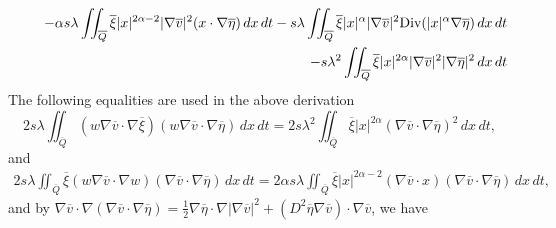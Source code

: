 \documentclass[11pt]{article}
\numberwithin{equation}{section}
\begin{document}
\begin{eqnarray*}
	&&\hspace{4.5mm} - \alpha s\lambda \iint_{\overline{Q}} \overline{\xi} |x|^{2\alpha-2} |\nabla \overline{v}|^2 (x \cdot \nabla \overline{\eta}) \, dx \, dt - s\lambda \iint_{\overline{Q}} \overline{\xi} |x|^\alpha |\nabla \overline{v}|^2 \text{Div}(|x|^\alpha \nabla \overline{\eta}) \, dx \, dt\\
	&&\hspace{4.5mm} - s\lambda^2 \iint_{\overline{Q}} \overline{\xi} |x|^{2\alpha} |\nabla \overline{v}|^2 |\nabla \overline{\eta}|^2 \, dx \, dt
\end{eqnarray*}
The following equalities are used in the above derivation
\begin{equation*}
	2s\lambda \iint_{\overline{Q}} (w \nabla \overline{v} \cdot \nabla \overline{\xi}) (w \nabla \overline{v} \cdot \nabla \overline{\eta}) \, dx \, dt = 2s\lambda^2 \iint_{\overline{Q}} \overline{\xi} |x|^{2\alpha} (\nabla \overline{v} \cdot \nabla \overline{\eta})^2 \, dx \, dt,
\end{equation*}
and
\begin{equation*}
	\begin{split}
		2s\lambda \iint_{\overline{Q}} \overline{\xi} (w \nabla \overline{v} \cdot \nabla w) (\nabla \overline{v} \cdot \nabla \overline{\eta}) \, dx \, dt = 2\alpha s\lambda \iint_{\overline{Q}} \overline{\xi} |x|^{2\alpha-2} (\nabla \overline{v} \cdot x) (\nabla \overline{v} \cdot \nabla \overline{\eta}) \, dx \, dt,
	\end{split}
\end{equation*}
and by $\nabla \overline{v} \cdot \nabla (\nabla \overline{v} \cdot \nabla \overline{\eta}) = \frac{1}{2} \nabla \overline{\eta} \cdot \nabla |\nabla \overline{v}|^2 + (D^2 \overline{\eta} \nabla \overline{v}) \cdot \nabla \overline{v}$, we have
\end{document}
